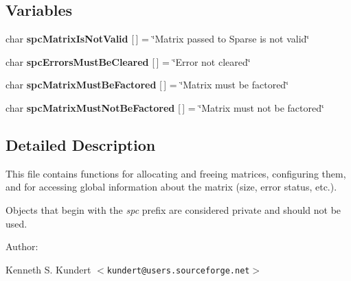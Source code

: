 \subsection*{Variables}
\begin{CompactItemize}
\item 
{}
char {\bf spc\-Matrix\-Is\-Not\-Valid} [$\,$] = \char`\"{}Matrix passed to Sparse is not valid\char`\"{}\label{spAllocate_8c_a3}

\item 
{}
char {\bf spc\-Errors\-Must\-Be\-Cleared} [$\,$] = \char`\"{}Error not cleared\char`\"{}\label{spAllocate_8c_a4}

\item 
{}
char {\bf spc\-Matrix\-Must\-Be\-Factored} [$\,$] = \char`\"{}Matrix must be factored\char`\"{}\label{spAllocate_8c_a5}

\item 
{}
char {\bf spc\-Matrix\-Must\-Not\-Be\-Factored} [$\,$] = \char`\"{}Matrix must not be factored\char`\"{}\label{spAllocate_8c_a6}

\end{CompactItemize}


\subsection{Detailed Description}
 This file contains functions for allocating and freeing matrices, configuring them, and for accessing global information about the matrix (size, error status, etc.).

Objects that begin with the {\em spc} prefix are considered private and should not be used.

\begin{Desc}
\item[Author: ]\par
 Kenneth S. Kundert $<${\tt kundert@users.sourceforge.net}$>$\end{Desc}


